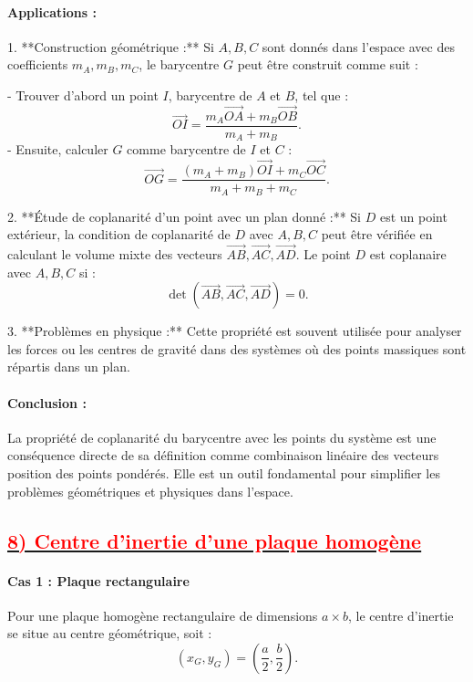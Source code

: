\documentclass{article}
\begin{document}
\paragraph{Applications :}  

1. **Construction géométrique :**  
   Si \( A, B, C \) sont donnés dans l’espace avec des coefficients \( m_A, m_B, m_C \), le barycentre \( G \) peut être construit comme suit :  
   
   - Trouver d’abord un point \( I \), barycentre de \( A \) et \( B \), tel que :  
     \[
     \overrightarrow{OI} = \frac{m_A \overrightarrow{OA} + m_B \overrightarrow{OB}}{m_A + m_B}.
     \]
   - Ensuite, calculer \( G \) comme barycentre de \( I \) et \( C \) :  
     \[
     \overrightarrow{OG} = \frac{(m_A + m_B)\overrightarrow{OI} + m_C \overrightarrow{OC}}{m_A + m_B + m_C}.
     \]

2. **Étude de coplanarité d’un point avec un plan donné :**  
   Si \( D \) est un point extérieur, la condition de coplanarité de \( D \) avec \( A, B, C \) peut être vérifiée en calculant le volume mixte des vecteurs \( \overrightarrow{AB}, \overrightarrow{AC}, \overrightarrow{AD} \).  
   Le point \( D \) est coplanaire avec \( A, B, C \) si :  
   \[
   \det(\overrightarrow{AB}, \overrightarrow{AC}, \overrightarrow{AD}) = 0.
   \]

3. **Problèmes en physique :**  
   Cette propriété est souvent utilisée pour analyser les forces ou les centres de gravité dans des systèmes où des points massiques sont répartis dans un plan.

\paragraph{Conclusion :}  
La propriété de coplanarité du barycentre avec les points du système est une conséquence directe de sa définition comme combinaison linéaire des vecteurs position des points pondérés. Elle est un outil fondamental pour simplifier les problèmes géométriques et physiques dans l’espace.


\subsection*{\underline{\textbf{\textcolor{red}{8) Centre d’inertie d’une plaque homogène}}}}

\paragraph{Cas 1 : Plaque rectangulaire}  
Pour une plaque homogène rectangulaire de dimensions \( a \times b \), le centre d’inertie se situe au centre géométrique, soit :  
\[
(x_G, y_G) = \left(\frac{a}{2}, \frac{b}{2}\right).
\]
\end{document}
